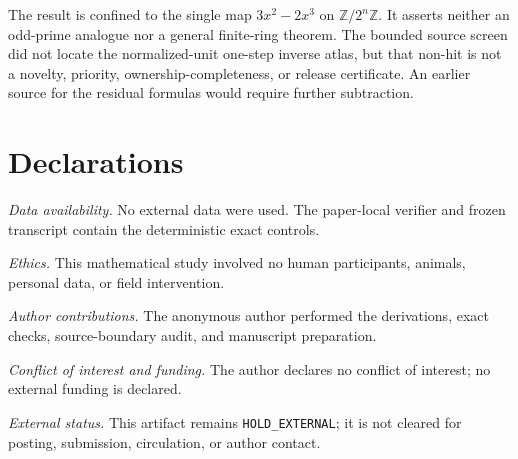 \documentclass[a4paper,10pt]{amsart}
\theoremstyle{remark}
\begin{document}
The result is confined to the single map $3x^2-2x^3$ on
$\mathbb Z/2^n\mathbb Z$.  It asserts neither an odd-prime analogue nor a
general finite-ring theorem.  The bounded source screen did not locate the
normalized-unit one-step inverse atlas, but that non-hit is not a novelty,
priority, ownership-completeness, or release certificate.  An earlier source
for the residual formulas would require further subtraction.

\section*{Declarations}
\noindent\textit{Data availability.}
No external data were used.  The paper-local verifier and frozen transcript
contain the deterministic exact controls.

\smallskip\noindent\textit{Ethics.}
This mathematical study involved no human participants, animals, personal
data, or field intervention.

\smallskip\noindent\textit{Author contributions.}
The anonymous author performed the derivations, exact checks, source-boundary
audit, and manuscript preparation.

\smallskip\noindent\textit{Conflict of interest and funding.}
The author declares no conflict of interest; no external funding is declared.

\smallskip\noindent\textit{External status.}
This artifact remains \texttt{HOLD\_EXTERNAL}; it is not cleared for posting,
submission, circulation, or author contact.



\end{document}
